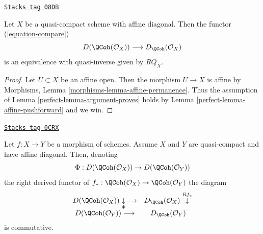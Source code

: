 \begin{proposition}
\label{perfect-proposition-quasi-compact-affine-diagonal}
\href{https://stacks.math.columbia.edu/tag/08DB}{\texttt{Stacks tag 08DB}}

Let $X$ be a quasi-compact scheme with affine diagonal.
Then the functor (\ref{equation-compare})
$$
D(\QCoh(\mathcal{O}_X))
\longrightarrow
D_\QCoh(\mathcal{O}_X)
$$
is an equivalence with quasi-inverse given by $RQ_X$.
\end{proposition}

\begin{proof}

Let $U \subset X$ be an affine open. Then the morphism
$U \to X$ is affine by
Morphisms, Lemma \ref{morphisms-lemma-affine-permanence}.
Thus the assumption of Lemma \ref{perfect-lemma-argument-proves}
holds by Lemma \ref{perfect-lemma-affine-pushforward} and we win.
\end{proof}

\begin{lemma}
\label{perfect-lemma-direct-image-coherator}
\href{https://stacks.math.columbia.edu/tag/0CRX}{\texttt{Stacks tag 0CRX}}

Let $f : X \to Y$ be a morphism of schemes.
Assume $X$ and $Y$ are quasi-compact and have affine diagonal.
Then, denoting
$$
\Phi : D(\QCoh(\mathcal{O}_X)) \to D(\QCoh(\mathcal{O}_Y))
$$
the right derived functor of
$f_* : \QCoh(\mathcal{O}_X) \to \QCoh(\mathcal{O}_Y)$
the diagram
$$
\begin{array}{cc}D(\QCoh(\mathcal{O}_X)) \underset{\Phi}{\downarrow}\longrightarrow & D_\QCoh(\mathcal{O}_X) \overset{Rf_*}{\downarrow} \\ D(\QCoh(\mathcal{O}_Y)) \longrightarrow & D_\QCoh(\mathcal{O}_Y)\end{array}
$$
is commutative.
\end{lemma}


